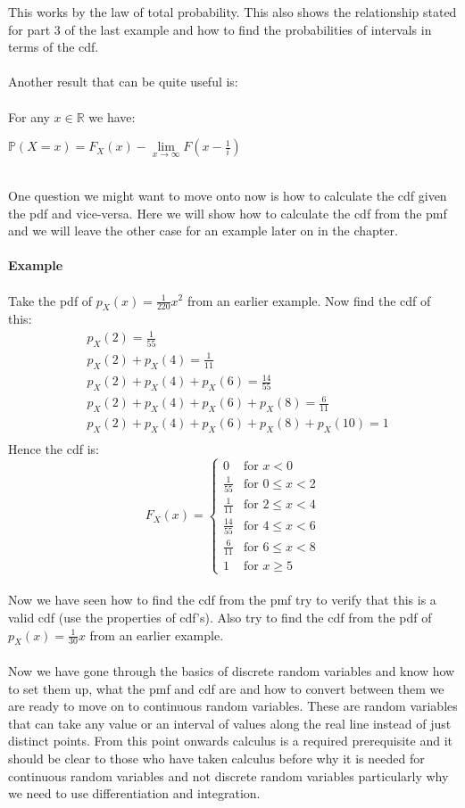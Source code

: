 \documentclass[,oneside]{article}
\begin{document}
\begin{enumerate}
\begin{center}
\end{center}
This works by the law of total probability. This also shows the relationship stated for part 3 of the last example and how to find the probabilities of intervals in terms of the cdf.\\ \\
Another result that can be quite useful is:\\  \\
For any $x \in \mathbb{R}$ we have:
\begin{center}
$\mathbb{P}(X = x) = F_X(x)- \lim\limits_{x\to\infty} F(x-\frac{1}{i})$
\end{center}\\
One question we might want to move onto now is how to calculate the cdf given the pdf and vice-versa. Here we will show how to calculate the cdf from the pmf and we will leave the other case for an example later on in the chapter.\\ \\
\textbf{Example}\\ \\
Take the pdf of $p_X(x)=\frac{1}{220}x^2$ from an earlier example. Now find the cdf of this:\\
\begin{align*}
&p_X(2) = \frac{1}{55}\\
&p_X(2) + p_X(4) = \frac{1}{11}\\
&p_X(2) + p_X(4) + p_X(6) = \frac{14}{55}\\ 
&p_X(2) + p_X(4) + p_X(6) + p_X(8) = \frac{6}{11}\\
&p_X(2) + p_X(4) + p_X(6) + p_X(8) + p_X(10) = 1\\
\end{align*}
Hence the cdf is:\\
\[
F_X(x) =
\begin{cases}
0 & \text{for } x < 0 \\
\frac{1}{55} & \text{for } 0 \leq x < 2 \\
\frac{1}{11} & \text{for } 2 \leq x < 4 \\
\frac{14}{55} & \text{for } 4 \leq x < 6 \\
\frac{6}{11} & \text{for } 6 \leq x < 8 \\
1 & \text{for } x \geq 5
\end{cases} \] \\
Now we have seen how to find the cdf from the pmf try to verify that this is a valid cdf (use the properties of cdf's). Also try to find the cdf from the pdf of $p_X(x)=\frac{1}{30}x$ from an earlier example.\\ \\
Now we have gone through the basics of discrete random variables and know how to set them up, what the pmf and cdf are and how to convert between them we are ready to move on to continuous random variables. These are random variables that can take any value or an interval of values along the real line instead of just distinct points. From this point onwards calculus is a required prerequisite and it should be clear to those who have taken calculus before why it is needed for continuous random variables and not discrete random variables particularly why we need to use differentiation and integration. 

\end{enumerate}
\end{document}
